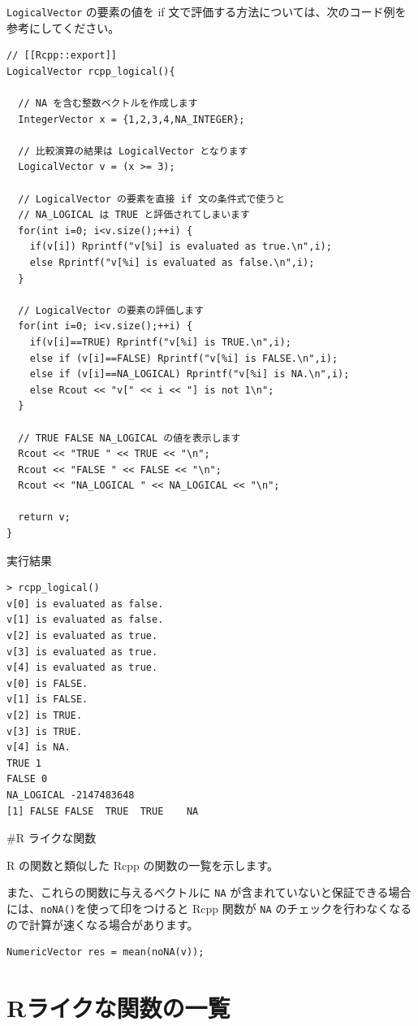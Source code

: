 \documentclass[]{book}
\begin{document}
\texttt{LogicalVector} の要素の値を if 文で評価する方法については、次のコード例を参考にしてください。

\begin{verbatim}
// [[Rcpp::export]]
LogicalVector rcpp_logical(){
  
  // NA を含む整数ベクトルを作成します
  IntegerVector x = {1,2,3,4,NA_INTEGER};
  
  // 比較演算の結果は LogicalVector となります
  LogicalVector v = (x >= 3); 
  
  // LogicalVector の要素を直接 if 文の条件式で使うと
  // NA_LOGICAL は TRUE と評価されてしまいます
  for(int i=0; i<v.size();++i) {
    if(v[i]) Rprintf("v[%i] is evaluated as true.\n",i);
    else Rprintf("v[%i] is evaluated as false.\n",i);
  } 
  
  // LogicalVector の要素の評価します
  for(int i=0; i<v.size();++i) {
    if(v[i]==TRUE) Rprintf("v[%i] is TRUE.\n",i);
    else if (v[i]==FALSE) Rprintf("v[%i] is FALSE.\n",i);
    else if (v[i]==NA_LOGICAL) Rprintf("v[%i] is NA.\n",i);
    else Rcout << "v[" << i << "] is not 1\n";
  }
  
  // TRUE FALSE NA_LOGICAL の値を表示します
  Rcout << "TRUE " << TRUE << "\n";
  Rcout << "FALSE " << FALSE << "\n";
  Rcout << "NA_LOGICAL " << NA_LOGICAL << "\n";
  
  return v;
}
\end{verbatim}

実行結果

\begin{verbatim}
> rcpp_logical()
v[0] is evaluated as false.
v[1] is evaluated as false.
v[2] is evaluated as true.
v[3] is evaluated as true.
v[4] is evaluated as true.
v[0] is FALSE.
v[1] is FALSE.
v[2] is TRUE.
v[3] is TRUE.
v[4] is NA.
TRUE 1
FALSE 0
NA_LOGICAL -2147483648
[1] FALSE FALSE  TRUE  TRUE    NA
\end{verbatim}

\#R ライクな関数

R の関数と類似した Rcpp の関数の一覧を示します。

また、これらの関数に与えるベクトルに \texttt{NA} が含まれていないと保証できる場合には、\texttt{noNA()}を使って印をつけると Rcpp 関数が \texttt{NA} のチェックを行わなくなるので計算が速くなる場合があります。

\begin{verbatim}
NumericVector res = mean(noNA(v));
\end{verbatim}

\hypertarget{r}{%
\section{Rライクな関数の一覧}\label{r}}
\end{document}

